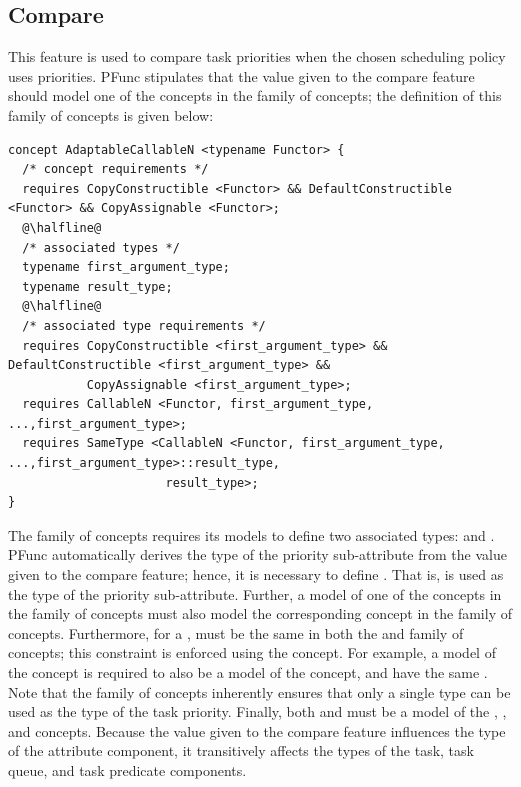 \subsection{Compare}
\label{subsec:compare}

This feature is used to compare task priorities when the chosen scheduling
policy uses priorities.  
%
PFunc stipulates that the value given to the compare feature should model one
of the concepts in the  family of concepts; the 
definition of this family of concepts is given below:

\begin{lstlisting}[columns=flexible]
concept AdaptableCallableN <typename Functor> {
  /* concept requirements */
  requires CopyConstructible <Functor> && DefaultConstructible <Functor> && CopyAssignable <Functor>;
  @\halfline@
  /* associated types */
  typename first_argument_type;
  typename result_type;
  @\halfline@
  /* associated type requirements */
  requires CopyConstructible <first_argument_type> && DefaultConstructible <first_argument_type> && 
           CopyAssignable <first_argument_type>;
  requires CallableN <Functor, first_argument_type, ...,first_argument_type>;
  requires SameType <CallableN <Functor, first_argument_type, ...,first_argument_type>::result_type, 
                      result_type>;
}
\end{lstlisting}

The  family of concepts requires its models to
define two associated types:  and
.
%
PFunc automatically derives the type of the priority sub-attribute from the
value given to the compare feature; hence, it is necessary to define
.
%
That is,  is used as the type of the priority
sub-attribute.
%
Further, a model of one of the concepts in the 
family of concepts must also model the corresponding concept in the
 family of concepts.
%
Furthermore, for a ,  must be the same in both
the  and  family of concepts;
this constraint is enforced using the  concept.
%
For example, a model of the  concept is required 
to also be a model of the  concept, and have the same 
.
%
Note that the  family of concepts inherently
ensures that only a single type can be used as the type of the task priority.
%
Finally, both  and  must be a model
of the , , and
 concepts. 
%
Because the value given to the compare feature influences the type of the
attribute component, it transitively affects the types of the task, task
queue, and task predicate components.

